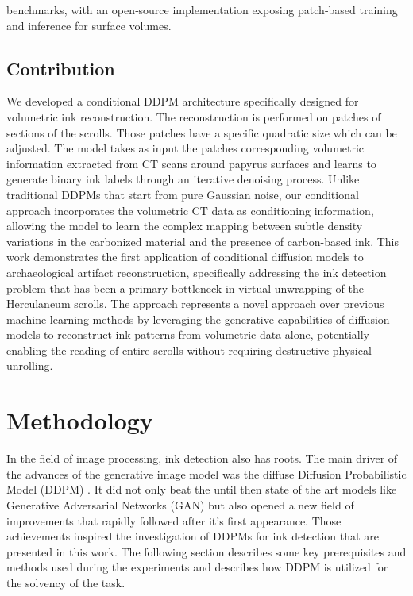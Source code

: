 \documentclass[runningheads]{llncs}
\begin{document}
benchmarks, with an open‑source implementation exposing patch‑based training and inference for surface volumes. \cite{first_title_prize_blog} \cite{first_title_prize_repo}
\subsection*{Contribution}
\label{subsec:contribution}
We developed a conditional DDPM architecture specifically designed for volumetric ink reconstruction. The reconstruction is performed on patches of sections of the scrolls. Those patches have a specific quadratic size which can be adjusted. The model takes as input the patches corresponding volumetric information extracted from CT scans around papyrus surfaces and learns to generate binary ink labels through an iterative denoising process. Unlike traditional DDPMs that start from pure Gaussian noise, our conditional approach incorporates the volumetric CT data as conditioning information, allowing the model to learn the complex mapping between subtle density variations in the carbonized material and the presence of carbon-based ink. This work demonstrates the first application of conditional diffusion models to archaeological artifact reconstruction, specifically addressing the ink detection problem that has been a primary bottleneck in virtual unwrapping of the Herculaneum scrolls. The approach represents a novel approach over previous machine learning methods by leveraging the generative capabilities of diffusion models to reconstruct ink patterns from volumetric data alone, potentially enabling the reading of entire scrolls without requiring destructive physical unrolling.
\section*{Methodology}
\label{sec:methodology}
In the field of image processing, ink detection also has roots. The main driver of the advances of the generative image model was the diffuse Diffusion Probabilistic Model (DDPM) \cite{ho_denoising_2020}. It did not only beat the until then state of the art models \cite{dhariwal_diffusion_2021} like Generative Adversarial Networks (GAN) but also opened a new field of improvements that rapidly followed after it's first appearance\cite{nichol_improved_2021}. Those achievements inspired the investigation of DDPMs for ink detection that are presented in this work. The following section describes some key prerequisites and methods used during the experiments and describes how DDPM is utilized for the solvency of the task.
\end{document}
